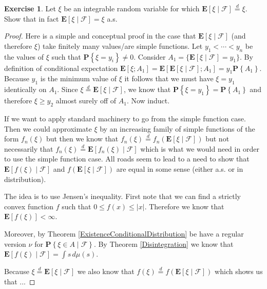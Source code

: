 \documentclass{amsbook}
\theoremstyle{definition}
\newtheorem{xca}{Exercise}
\theoremstyle{remark}
\newcommand{\expectation}[1]{\textbf{E}\left[#1\right]}
\newcommand{\cexpectationlong}[2]{\textbf{E}\left[ #2 \mid #1 \right]}
\newcommand{\probability}[1]{\textbf{P}\left \{#1 \right \}}
\newcommand{\cprobability}[2]{\textbf{P} \left \{#2 \mid #1 \right \}}
\newcommand{\abs}[1]{\left \vert #1 \right \vert}
\newcommand{\eqdist}{\overset{d}=}
\begin{document}
\begin{xca}Let $\xi$ be an integrable random variable for which
  $\cexpectationlong{\mathcal{F}}{\xi} \eqdist \xi$.  Show that in
  fact $\cexpectationlong{\mathcal{F}}{\xi} = \xi$ a.s.
\end{xca}
\begin{proof}
Here is a simple and conceptual proof in the case that
$\cexpectationlong{\mathcal{F}}{\xi}$ (and therefore $\xi$) take
finitely many values/are simple functions.  Let $y_1 < \cdots < y_n$ be the values of
$\xi$ such that $\probability{\xi = y_i} \neq 0$.   Consider $A_1 = \lbrace \cexpectationlong{\mathcal{F}}{\xi} =
y_1 \rbrace$.  By definition of conditional expectation
$\expectation{\xi ; A_1} =
\expectation{\cexpectationlong{\mathcal{F}}{\xi} ; A_1} = y_1
\probability{A_1}$.  Because $y_1$ is the minimum value of $\xi$ it
follows that we must have $\xi = y_1$ identically on $A_1$.  Since $\xi \eqdist
\cexpectationlong{\mathcal{F}}{\xi} $, we know that $\probability{\xi
  = y_1} = \probability{A_1}$ and therefore $\xi \geq y_2$ almost
surely off of $A_1$.  Now induct.

If we want to apply standard machinery to go from the
simple function case.  Then we could approximate $\xi$ by an
increasing family of simple functions of the form $f_n(\xi)$ but then
we know that $f_n(\xi) \eqdist
f_n(\cexpectationlong{\mathcal{F}}{\xi})$ but not necessarily that $f_n(\xi) \eqdist
\cexpectationlong{\mathcal{F}}{f_n(\xi)}$ which is what we would need
in order to use the simple function case.  All roads seem to lead to a
need to show that $\cexpectationlong{\mathcal{F}}{f(\xi)}$ and
$f(\cexpectationlong{\mathcal{F}}{\xi})$ are equal in some sense
(either a.s. or in distribution).

The idea is to use Jensen's inequality.  First note that
  we can find a strictly convex function $f$ such that $0 \leq f(x)
  \leq \abs{x}$.  Therefore we know that $\expectation{f(\xi)} <
  \infty$.  

Moreover, by Theorem \ref{ExistenceConditionalDistribution} be have a
regular version $\nu$ for $\cprobability{\mathcal{F}}{\xi \in A}$.  By
Theorem \ref{Disintegration} we know that
$\cexpectationlong{\mathcal{F}}{f(\xi)} = \int s \, d\mu(s)$.

Because $\xi \eqdist \cexpectationlong{\mathcal{F}}{\xi}$ we also know
that $f(\xi) \eqdist f(\cexpectationlong{\mathcal{F}}{\xi})$ which
shows us that ... 


\end{proof}
\end{document}
